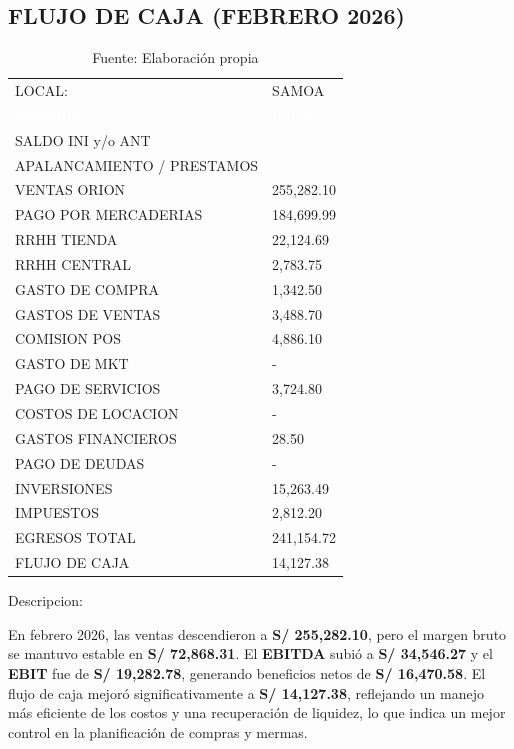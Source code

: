 \subsection*{FLUJO DE CAJA (FEBRERO 2026)}

\begin{table}[H]
\centering
\begin{tabular}{|L{8cm}|R{4cm}|}
\hline
{} LOCAL: &  SAMOA \\
\textcolor{white}{PERIODO:} & \textcolor{white}{Feb-24} \\ \hline
SALDO INI y/o ANT & \\ 
APALANCAMIENTO / PRESTAMOS & \\ 
 VENTAS ORION & 255,282.10 \\ 
PAGO POR MERCADERIAS & 184,699.99 \\ 
RRHH TIENDA & 22,124.69 \\ 
RRHH CENTRAL & 2,783.75 \\ 
GASTO DE COMPRA & 1,342.50 \\ 
GASTOS DE VENTAS & 3,488.70 \\ 
COMISION POS & 4,886.10 \\ 
GASTO DE MKT & - \\ 
PAGO DE SERVICIOS & 3,724.80 \\ 
COSTOS DE LOCACION & - \\ 
GASTOS FINANCIEROS & 28.50 \\ 
PAGO DE DEUDAS & - \\ 
INVERSIONES & 15,263.49 \\ 
IMPUESTOS & 2,812.20 \\ 
 EGRESOS TOTAL & 241,154.72 \\ 
 FLUJO DE CAJA & 14,127.38 \\ \hline
\end{tabular}
\caption{Fuente: Elaboración propia}
\end{table}

Descripcion:

En febrero 2026, las ventas descendieron a \textbf{S/ 255,282.10}, pero el margen bruto se mantuvo estable en \textbf{S/ 72,868.31}. El \textbf{EBITDA} subió a \textbf{S/ 34,546.27} y el \textbf{EBIT} fue de \textbf{S/ 19,282.78}, generando beneficios netos de \textbf{S/ 16,470.58}. El flujo de caja mejoró significativamente a \textbf{S/ 14,127.38}, reflejando un manejo más eficiente de los costos y una recuperación de liquidez, lo que indica un mejor control en la planificación de compras y mermas.

